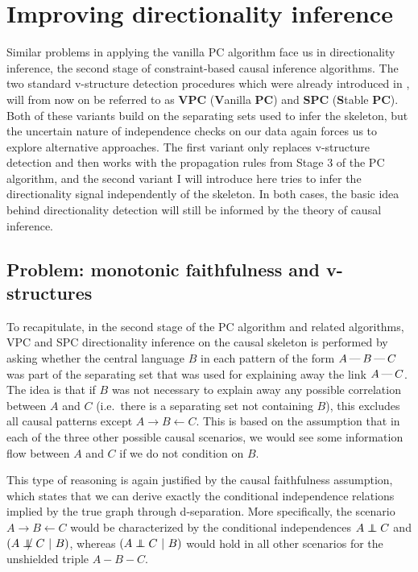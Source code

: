 \section{Improving directionality inference}\label{sec:6.5}
Similar problems in applying the vanilla PC algorithm face us in directionality inference, the second stage of constraint-based causal inference algorithms. The two standard v-structure detection procedures which were already introduced in , will from now on be referred to as \textbf{VPC} (\textbf{V}anilla \textbf{PC}) and \textbf{SPC} (\textbf{S}table \textbf{PC}). Both of these variants build on the separating sets used to infer the skeleton, but the uncertain nature of independence checks on our data again forces us to explore alternative approaches. The first variant only replaces v-structure detection and then works with the propagation rules from Stage 3 of the PC algorithm, and the second variant I will introduce here tries to infer the directionality signal independently of the skeleton. In both cases, the basic idea behind directionality detection will still be informed by the theory of causal inference.

\subsection{Problem: monotonic faithfulness and v-structures}
To recapitulate, in the second stage of the PC algorithm and related algorithms, VPC and SPC directionality inference on the causal skeleton is performed by asking whether the central language $B$ in each pattern of the form $A \kern 2pt\hbox{---}\kern 2pt B \kern 2pt\hbox{---}\kern 2pt C$ was part of the separating set that was used for explaining away the link $A \kern 2pt\hbox{---}\kern 2pt C$. The idea is that if $B$ was not necessary to explain away any possible correlation between $A$ and $C$ (i.e.\ there is a separating set not containing $B$), this excludes all causal patterns except $A \rightarrow B \leftarrow C$. This is based on the assumption that in each of the three other possible causal scenarios, we would see some information flow between $A$ and $C$ if we do not condition on $B$.

This type of reasoning is again justified by the causal faithfulness assumption, which states that we can derive exactly the conditional independence relations implied by the true graph through d-separation. More specifically, the scenario $A \rightarrow B \leftarrow C$ would be characterized by the conditional independences $A \indep C$ and $(A \notindep C\ |\ B)$, whereas $(A \indep C\ |\ B)$ would hold in all other scenarios for the unshielded triple $A - B - C$.

